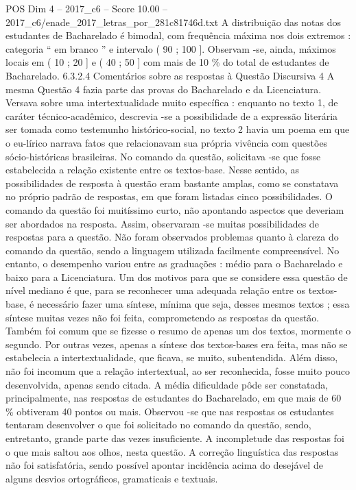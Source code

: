 \begin{textsample}{POS Dim 4 – 2017\_c6 – Score 10.00 – 2017\_c6/enade\_2017\_letras\_por\_281c81746d.txt}
A distribuição das notas dos estudantes de Bacharelado é bimodal, com frequência máxima nos dois extremos : categoria “ em branco ” e intervalo ( 90 ; 100 ].
Observam -se, ainda, máximos locais em ( 10 ; 20 ] e ( 40 ; 50 ] com mais de 10 \% do total de estudantes de Bacharelado. 6.3.2.4 Comentários sobre as respostas à Questão Discursiva 4 A mesma Questão 4 fazia parte das provas do Bacharelado e da Licenciatura.
Versava sobre uma intertextualidade muito específica : enquanto no texto 1, de caráter técnico-acadêmico, descrevia -se a possibilidade de a expressão literária ser tomada como testemunho histórico-social, no texto 2 havia um poema em que o eu-lírico narrava fatos que relacionavam sua própria vivência com questões sócio-históricas brasileiras.
No comando da questão, solicitava -se que fosse estabelecida a relação existente entre os textos-base.
Nesse sentido, as possibilidades de resposta à questão eram bastante amplas, como se constatava no próprio padrão de respostas, em que foram listadas cinco possibilidades.
O comando da questão foi muitíssimo curto, não apontando aspectos que deveriam ser abordados na resposta.
Assim, observaram -se muitas possibilidades de respostas para a questão.
Não foram observados problemas quanto à clareza do comando da questão, sendo a linguagem utilizada facilmente compreensível.
No entanto, o desempenho variou entre as graduações : médio para o Bacharelado e baixo para a Licenciatura.
Um dos motivos para que se considere essa questão de nível mediano é que, para se reconhecer uma adequada relação entre os textos-base, é necessário fazer uma síntese, mínima que seja, desses mesmos textos ; essa síntese muitas vezes não foi feita, comprometendo as respostas da questão.
Também foi comum que se fizesse o resumo de apenas um dos textos, mormente o segundo.
Por outras vezes, apenas a síntese dos textos-bases era feita, mas não se estabelecia a intertextualidade, que ficava, se muito, subentendida.
Além disso, não foi incomum que a relação intertextual, ao ser reconhecida, fosse muito pouco desenvolvida, apenas sendo citada.
A média dificuldade pôde ser constatada, principalmente, nas respostas de estudantes do Bacharelado, em que mais de 60 \% obtiveram 40 pontos ou mais.
Observou -se que nas respostas os estudantes tentaram desenvolver o que foi solicitado no comando da questão, sendo, entretanto, grande parte das vezes insuficiente.
A incompletude das respostas foi o que mais saltou aos olhos, nesta questão.
A correção linguística das respostas não foi satisfatória, sendo possível apontar incidência acima do desejável de alguns desvios ortográficos, gramaticais e textuais.

\end{textsample}
